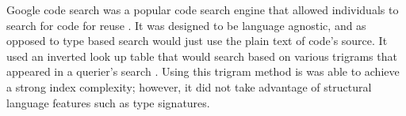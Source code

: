 Google code search was a popular code search engine that allowed individuals to search for code for reuse \cite{codeSearch}.
It was designed to be language agnostic, and as opposed to type based search would just use the plain text of code's source.
It used an inverted look up table that would search based on various trigrams that appeared in a querier's search \cite{cox}.
Using this trigram method is was able to achieve a strong index complexity;
however, it did not take advantage of structural language features such as type signatures.